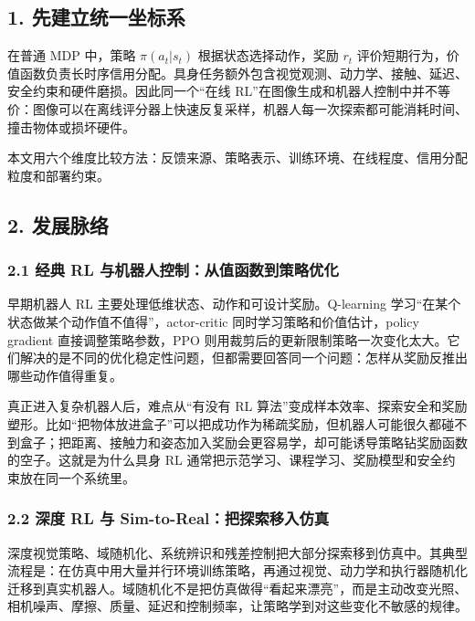 \documentclass[
  chinese,
]{article}
\begin{document}
\subsection{1.
先建立统一坐标系}\label{1-ux5148ux5efaux7acbux7edfux4e00ux5750ux6807ux7cfb}

在普通 MDP 中，策略 \(\pi(a_t|s_t)\) 根据状态选择动作，奖励 \(r_t\)
评价短期行为，价值函数负责长时序信用分配。具身任务额外包含视觉观测、动力学、接触、延迟、安全约束和硬件磨损。因此同一个``在线
RL''在图像生成和机器人控制中并不等价：图像可以在离线评分器上快速反复采样，机器人每一次探索都可能消耗时间、撞击物体或损坏硬件。

本文用六个维度比较方法：反馈来源、策略表示、训练环境、在线程度、信用分配粒度和部署约束。

\subsection{2. 发展脉络}\label{2-ux53d1ux5c55ux8109ux7edc}

\subsubsection{2.1 经典 RL
与机器人控制：从值函数到策略优化}\label{21-ux7ecfux5178-rl-ux4e0eux673aux5668ux4ebaux63a7ux5236ux4eceux503cux51fdux6570ux5230ux7b56ux7565ux4f18ux5316}

早期机器人 RL 主要处理低维状态、动作和可设计奖励。Q-learning
学习``在某个状态做某个动作值不值得''，actor-critic
同时学习策略和价值估计，policy gradient 直接调整策略参数，PPO
则用裁剪后的更新限制策略一次变化太大。它们解决的是不同的优化稳定性问题，但都需要回答同一个问题：怎样从奖励反推出哪些动作值得重复。

真正进入复杂机器人后，难点从``有没有 RL
算法''变成样本效率、探索安全和奖励塑形。比如``把物体放进盒子''可以把成功作为稀疏奖励，但机器人可能很久都碰不到盒子；把距离、接触力和姿态加入奖励会更容易学，却可能诱导策略钻奖励函数的空子。这就是为什么具身
RL 通常把示范学习、课程学习、奖励模型和安全约束放在同一个系统里。

\subsubsection{2.2 深度 RL 与
Sim-to-Real：把探索移入仿真}\label{22-ux6df1ux5ea6-rl-ux4e0e-sim-to-realux628aux63a2ux7d22ux79fbux5165ux4effux771f}

深度视觉策略、域随机化、系统辨识和残差控制把大部分探索移到仿真中。其典型流程是：在仿真中用大量并行环境训练策略，再通过视觉、动力学和执行器随机化迁移到真实机器人。域随机化不是把仿真做得``看起来漂亮''，而是主动改变光照、相机噪声、摩擦、质量、延迟和控制频率，让策略学到对这些变化不敏感的规律。
\end{document}
